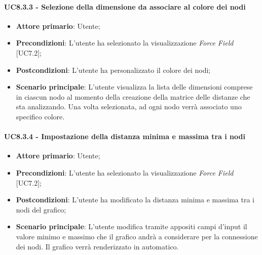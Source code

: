 \paragraph{UC8.3.3 - Selezione della dimensione da associare al colore dei nodi}
\begin{itemize}
	\item \textbf{Attore primario}: Utente;
	\item \textbf{Precondizioni}: L'utente ha selezionato la visualizzazione \textit{Force Field} [UC7.2];
	\item \textbf{Postcondizioni}: L'utente ha personalizzato il colore dei nodi;
	
	\item \textbf{Scenario principale}: L'utente visualizza la lista delle dimensioni comprese in ciascun nodo al momento della creazione della matrice delle distanze che sta analizzando. Una volta selezionata, ad ogni nodo verrà associato uno specifico colore.
\end{itemize}

\paragraph{UC8.3.4 - Impostazione della distanza minima e massima tra i nodi}
\begin{itemize}
	\item \textbf{Attore primario}: Utente;
	\item \textbf{Precondizioni}: L'utente ha selezionato la visualizzazione \textit{Force Field} [UC7.2];
	\item \textbf{Postcondizioni}: L'utente ha modificato la distanza minima e massima tra i nodi del grafico;
	
	\item \textbf{Scenario principale}: L'utente modifica tramite appositi campi d'input il valore minimo e massimo che il grafico andrà a considerare per la connessione dei nodi. Il grafico verrà renderizzato in automatico.
\end{itemize}



